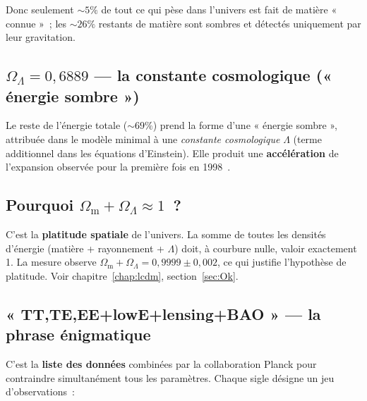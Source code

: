 \documentclass[11pt,a4paper,openany]{report}
\newcommand{\Om}{\Omega_{\mathrm{m}}}
\newcommand{\OL}{\Omega_{\Lambda}}
\begin{document}
Donc seulement $\sim 5\%$ de tout ce qui pèse dans l'univers est fait de
matière « connue »~; les $\sim 26\%$ restants de matière sont sombres et
détectés uniquement par leur gravitation.

\subsection{$\OL = 0{,}6889$ --- la constante cosmologique (« énergie sombre »)}

Le reste de l'énergie totale ($\sim 69\%$) prend la forme d'une « énergie
sombre », attribuée dans le modèle minimal à une \emph{constante cosmologique}
$\Lambda$ (terme additionnel dans les équations d'Einstein). Elle produit une
\textbf{accélération} de l'expansion observée pour la première fois en
1998~\cite{Riess1998,Perlmutter1999}.

\subsection{Pourquoi $\Om + \OL \approx 1$~?}

C'est la \textbf{platitude spatiale} de l'univers. La somme de toutes les
densités d'énergie (matière + rayonnement + $\Lambda$) doit, à courbure
nulle, valoir exactement 1. La mesure observe $\Om + \OL = 0{,}9999\pm 0{,}002$,
ce qui justifie l'hypothèse de platitude. Voir
chapitre~\ref{chap:lcdm}, section~\ref{sec:Ok}.

\subsection{« TT,TE,EE+lowE+lensing+BAO » --- la phrase énigmatique}

C'est la \textbf{liste des données} combinées par la collaboration Planck pour
contraindre simultanément tous les paramètres. Chaque sigle désigne un jeu
d'observations~:
\end{document}
